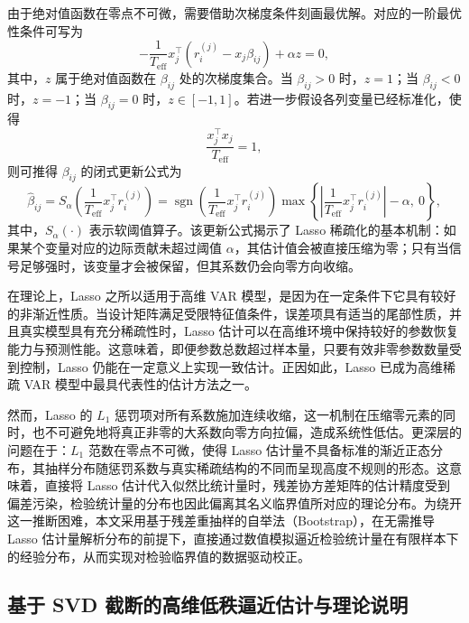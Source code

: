 由于绝对值函数在零点不可微，需要借助次梯度条件刻画最优解。对应的一阶最优性条件可写为
\begin{equation}
 -\frac{1}{T_{\mathrm{eff}}}x_j^{\top}(r_i^{(j)}-x_j\beta_{ij})+\alpha z=0,
\end{equation}
其中，$z$ 属于绝对值函数在 $\beta_{ij}$ 处的次梯度集合。当 $\beta_{ij}>0$ 时，$z=1$；当 $\beta_{ij}<0$ 时，$z=-1$；当 $\beta_{ij}=0$ 时，$z\in[-1,1]$。若进一步假设各列变量已经标准化，使得
\begin{equation}
 \frac{x_j^{\top}x_j}{T_{\mathrm{eff}}}=1,
\end{equation}
则可推得 $\beta_{ij}$ 的闭式更新公式为
\begin{equation}
 \hat{\beta}_{ij}=S_{\alpha}\left(\frac{1}{T_{\mathrm{eff}}}x_j^{\top}r_i^{(j)}\right)
 =\operatorname{sgn}\left(\frac{1}{T_{\mathrm{eff}}}x_j^{\top}r_i^{(j)}\right)
 \max\left\{
 \left|\frac{1}{T_{\mathrm{eff}}}x_j^{\top}r_i^{(j)}\right|-\alpha,\ 0
 \right\},
\end{equation}
其中，$S_{\alpha}(\cdot)$ 表示软阈值算子。该更新公式揭示了 Lasso 稀疏化的基本机制：如果某个变量对应的边际贡献未超过阈值 $\alpha$，其估计值会被直接压缩为零；只有当信号足够强时，该变量才会被保留，但其系数仍会向零方向收缩。

在理论上，Lasso 之所以适用于高维 VAR 模型，是因为在一定条件下它具有较好的非渐近性质。当设计矩阵满足受限特征值条件，误差项具有适当的尾部性质，并且真实模型具有充分稀疏性时，Lasso 估计可以在高维环境中保持较好的参数恢复能力与预测性能。这意味着，即便参数总数超过样本量，只要有效非零参数数量受到控制，Lasso 仍能在一定意义上实现一致估计。正因如此，Lasso 已成为高维稀疏 VAR 模型中最具代表性的估计方法之一。

然而，Lasso 的 $L_1$ 惩罚项对所有系数施加连续收缩，这一机制在压缩零元素的同时，也不可避免地将真正非零的大系数向零方向拉偏，造成系统性低估。更深层的问题在于：$L_1$ 范数在零点不可微，使得 Lasso 估计量不具备标准的渐近正态分布，其抽样分布随惩罚系数与真实稀疏结构的不同而呈现高度不规则的形态。这意味着，直接将 Lasso 估计代入似然比统计量时，残差协方差矩阵的估计精度受到偏差污染，检验统计量的分布也因此偏离其名义临界值所对应的理论分布。为绕开这一推断困难，本文采用基于残差重抽样的自举法（Bootstrap），在无需推导 Lasso 估计量解析分布的前提下，直接通过数值模拟逼近检验统计量在有限样本下的经验分布，从而实现对检验临界值的数据驱动校正。

\subsection{基于 SVD 截断的高维低秩逼近估计与理论说明}

